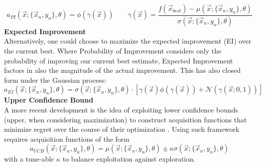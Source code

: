 \documentclass[12pt, a4paper]{article}
\begin{document}
\begin{equation}
    a_{PI}(\vec{x};\{\vec{x}_n ,y_n\},\theta) = \phi(\gamma(\vec{x}))
    \qquad
    \gamma(\vec{x}) = \frac{f(\vec{x}_{best}) - \mu(\vec{x}; \{\vec{x}_n,y_n\},\theta)}{\sigma(\vec{x};\{\vec{x}_n,y_n\},\theta)}
\end{equation}
\textbf{Expected Improvement} \\
Alternatively, one could choose to maximize the expected improvement (EI) over the current best. Where Probability of Improvement considers only the probability of improving our current best estimate, Expected Improvement factors in also the magnitude of the actual improvement. This has also closed form under the Gaussian process:
\begin{equation}
\label{eq: ei_short}
    a_{EI}(\vec{x};\{\vec{x}_n ,y_n\},\theta) = \sigma(\vec{x};\{\vec{x}_n ,y_n\},\theta) \cdot
    [\gamma ( \vec{x} ) \phi(\gamma(\vec{x}))
    + \mathcal{N}(\gamma(\vec{x};0,1))]
\end{equation}
\textbf{Upper Confidence Bound}\\
A more recent development is the idea of exploiting lower confidence bounds (upper, when considering maximization) to construct acquisition functions that minimize regret over the course of their optimization \cite{Srinivas2009, Snoek2012}. Using such framework requires acquisition functions of the form
\begin{equation}
    a_{UCB}(\vec{x};\{\vec{x}_n ,y_n\},\theta) = \mu(\vec{x};\{\vec{x}_n ,y_n\},\theta)
    \pm \kappa \sigma(\vec{x};\{\vec{x}_n ,y_n\},\theta)
\end{equation}
with a tune-able $\kappa$ to balance exploitation against exploration.
\end{document}
